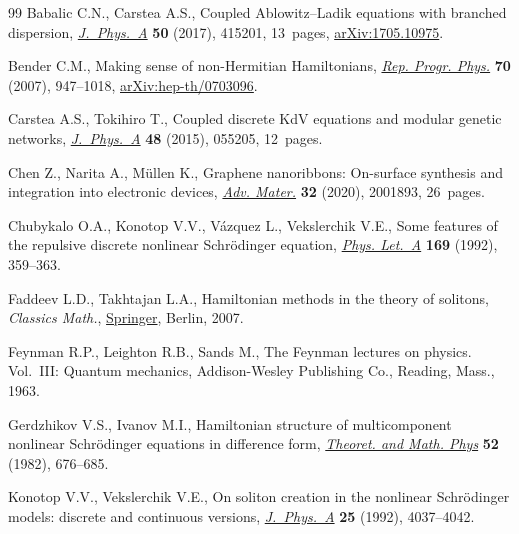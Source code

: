 \documentclass[10pt,a4paper]{amsart}
\numberwithin{equation}{section}
\begin{document}
\begin{thebibliography}{99}
Babalic C.N., Carstea A.S., Coupled {A}blowitz--{L}adik equations with branched
 dispersion,
 \href{https://doi.org/10.1088/1751-8121/aa87a4}{\textit{J.~Phys.~A}}
 \textbf{50} (2017), 415201, 13~pages,
 \href{http://arxiv.org/abs/1705.10975}{arXiv:1705.10975}.

Bender C.M., Making sense of non-{H}ermitian {H}amiltonians,
 \href{https://doi.org/10.1088/0034-4885/70/6/R03}{\textit{Rep. Progr. Phys.}}
 \textbf{70} (2007), 947--1018,
 \href{http://arxiv.org/abs/hep-th/0703096}{arXiv:hep-th/0703096}.

Carstea A.S., Tokihiro T., Coupled discrete {K}d{V} equations and modular
 genetic networks,
 \href{https://doi.org/10.1088/1751-8113/48/5/055205}{\textit{J.~Phys.~A}}
 \textbf{48} (2015), 055205, 12~pages.

Chen Z., Narita A., M\"ullen K., Graphene nanoribbons: On-surface synthesis and
 integration into electronic devices,
 \href{https://doi.org/10.1002/adma.202001893}{\textit{Adv. Mater.}}
 \textbf{32} (2020), 2001893, 26~pages.

Chubykalo O.A., Konotop V.V., V\'azquez L., Vekslerchik V.E., Some features of
 the repulsive discrete nonlinear Schr\"odinger equation,
 \href{https://doi.org/10.1016/0375-9601(92)90241-D}{\textit{Phys. Let.~A}}
 \textbf{169} (1992), 359--363.

Faddeev L.D., Takhtajan L.A., Hamiltonian methods in the theory of solitons,
 \textit{Classics Math.}, \href{https://doi.org/10.1007/978-3-540-69969-9}{Springer},
 Berlin, 2007.

Feynman R.P., Leighton R.B., Sands M., The {F}eynman lectures on physics.
 {V}ol.~{III}: {Q}uantum mechanics, Addison-Wesley
 Publishing Co., Reading, Mass., 1963.

Gerdzhikov V.S., Ivanov M.I., {H}amiltonian structure of multicomponent
 nonlinear {S}chr\"odinger equations in difference form,
 \href{https://doi.org/10.1007/BF01027788}{\textit{Theoret. and Math. Phys}}
 \textbf{52} (1982), 676--685.

Konotop V.V., Vekslerchik V.E., On soliton creation in the nonlinear
 {S}chr\"odinger models: discrete and continuous versions,
 \href{https://doi.org/10.1088/0305-4470/25/14/018}{\textit{J.~Phys.~A}}
 \textbf{25} (1992), 4037--4042.


\end{thebibliography}
\end{document}
